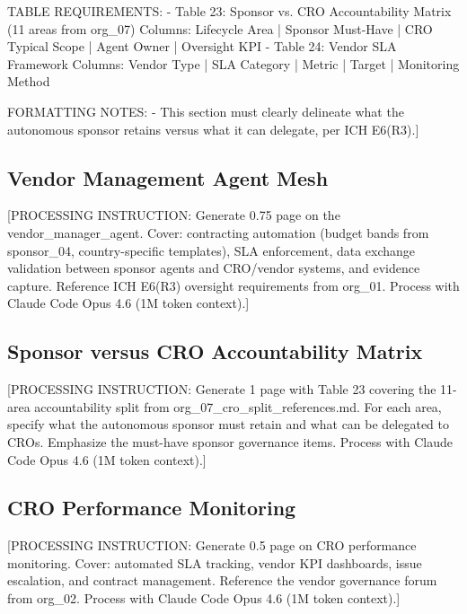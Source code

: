 TABLE REQUIREMENTS:
- Table 23: Sponsor vs. CRO Accountability Matrix (11 areas from org\_07)
  Columns: Lifecycle Area | Sponsor Must-Have | CRO Typical Scope | Agent Owner | Oversight KPI
- Table 24: Vendor SLA Framework
  Columns: Vendor Type | SLA Category | Metric | Target | Monitoring Method

FORMATTING NOTES:
- This section must clearly delineate what the autonomous sponsor retains
  versus what it can delegate, per ICH E6(R3).]

\subsection{Vendor Management Agent Mesh}

[PROCESSING INSTRUCTION: Generate 0.75 page on the vendor\_manager\_agent. Cover: contracting
automation (budget bands from sponsor\_04, country-specific templates), SLA enforcement,
data exchange validation between sponsor agents and CRO/vendor systems, and evidence
capture. Reference ICH E6(R3) oversight requirements from org\_01.
Process with Claude Code Opus 4.6 (1M token context).]

\subsection{Sponsor versus CRO Accountability Matrix}

[PROCESSING INSTRUCTION: Generate 1 page with Table 23 covering the 11-area accountability
split from org\_07\_cro\_split\_references.md. For each area, specify what the autonomous
sponsor must retain and what can be delegated to CROs. Emphasize the must-have sponsor
governance items. Process with Claude Code Opus 4.6 (1M token context).]

\subsection{CRO Performance Monitoring}

[PROCESSING INSTRUCTION: Generate 0.5 page on CRO performance monitoring. Cover: automated
SLA tracking, vendor KPI dashboards, issue escalation, and contract management.
Reference the vendor governance forum from org\_02.
Process with Claude Code Opus 4.6 (1M token context).]
